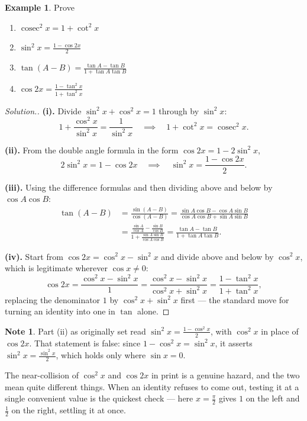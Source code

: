 \documentclass[11pt,a4paper]{article}
\theoremstyle{definition}
\newtheorem{example}[thm]{Example}
\newtheorem{note}[thm]{Note}
\newenvironment{solution}
  {\renewcommand{\qedsymbol}{}\begin{proof}[\textit{Solution}.]}
  {\end{proof}}
\begin{document}
\begin{example}
Prove
\begin{enumerate}
\item[(i).] $\operatorname{cosec}^{2}x = 1 + \cot^{2}x$
\item[(ii).] $\sin^{2}x = \frac{1 - \cos 2x}{2}$
\item[(iii).] $\tan (A - B) = \frac{\tan A - \tan B}{1 + \tan A \tan B}$
\item[(iv).] $\cos 2x = \frac{1 - \tan^{2}x}{1 + \tan^{2}x}$
\end{enumerate}
\end{example}

\begin{solution}
\textbf{(i).} Divide $\sin^{2}x+\cos^{2}x=1$ through by $\sin^{2}x$:
$$1+\frac{\cos^{2}x}{\sin^{2}x}=\frac{1}{\sin^{2}x}
\quad \implies\quad 
1+\cot^{2}x=\operatorname{cosec}^{2}x .$$

\textbf{(ii).} From the double angle formula in the form
$\cos 2x=1-2\sin^{2}x$,
$$2\sin^{2}x=1-\cos 2x
\quad \implies\quad 
\sin^{2}x=\frac{1-\cos 2x}{2} .$$

\textbf{(iii).} Using the difference formulas and then dividing above and below by
$\cos A\cos B$:
\begin{align*}
\tan(A-B)&=\frac{\sin(A-B)}{\cos(A-B)}
          =\frac{\sin A\cos B-\cos A\sin B}{\cos A\cos B+\sin A\sin B}\\[4pt]
         &=\frac{\frac{\sin A}{\cos A}-\frac{\sin B}{\cos B}}
                 {1+\frac{\sin A\sin B}{\cos A\cos B}}
          =\frac{\tan A-\tan B}{1+\tan A\tan B} .
\end{align*}

\textbf{(iv).} Start from $\cos 2x=\cos^{2}x-\sin^{2}x$ and divide above and below
by $\cos^{2}x$, which is legitimate wherever $\cos x\neq 0$:
$$\cos 2x=\frac{\cos^{2}x-\sin^{2}x}{1}
=\frac{\cos^{2}x-\sin^{2}x}{\cos^{2}x+\sin^{2}x}
=\frac{1-\tan^{2}x}{1+\tan^{2}x} ,$$
replacing the denominator $1$ by $\cos^{2}x+\sin^{2}x$ first --- the standard move
for turning an identity into one in $\tan$ alone.
\end{solution}

\begin{note}
Part (ii) as originally set read $\sin^{2}x=\frac{1-\cos^{2}x}{2}$, with
$\cos^{2}x$ in place of $\cos 2x$. That statement is false: since
$1-\cos^{2}x=\sin^{2}x$, it asserts $\sin^{2}x=\frac{\sin^{2}x}{2}$, which holds
only where $\sin x=0$.

The near-collision of $\cos^{2}x$ and $\cos 2x$ in print is a genuine hazard, and
the two mean quite different things. When an identity refuses to come out, testing
it at a single convenient value is the quickest check --- here $x=\frac{\pi}{2}$
gives $1$ on the left and $\frac{1}{2}$ on the right, settling it at once.
\end{note}
\end{document}

